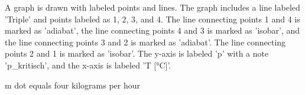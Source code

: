 A graph is drawn with labeled points and lines. The graph includes a line labeled 'Triple' and points labeled as 1, 2, 3, and 4. The line connecting points 1 and 4 is marked as 'adiabat', the line connecting points 4 and 3 is marked as 'isobar', and the line connecting points 3 and 2 is marked as 'adiabat'. The line connecting points 2 and 1 is marked as 'isobar'. The y-axis is labeled 'p' with a note 'p_kritisch', and the x-axis is labeled 'T [°C]'.

m dot equals four kilograms per hour